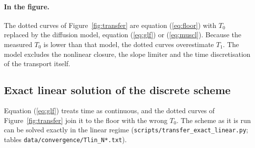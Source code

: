 \documentclass[11pt]{article}
\begin{document}
\paragraph{In the figure.} The dotted curves of Figure~\ref{fig:transfer} are equation (\ref{eq:floor})
with $T_0$ replaced by the diffusion model, equation (\ref{eq:glf}) or (\ref{eq:muscl}). Because the
measured $T_0$ is lower than that model, the dotted curves overestimate $T_1$. The model excludes the
nonlinear closure, the slope limiter and the time discretisation of the transport itself.

\subsection{Exact linear solution of the discrete scheme}\label{sec:disc}

Equation (\ref{eq:glf}) treats time as continuous, and the dotted curves of Figure~\ref{fig:transfer}
join it to the floor with the wrong $T_0$. The scheme as it is run can be solved exactly in the linear
regime (\texttt{scripts/transfer\_exact\_linear.py}; tables \texttt{data/convergence/Tlin\_N*.txt}).
\end{document}
